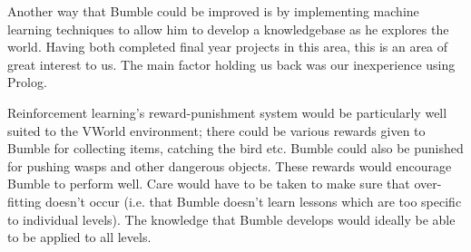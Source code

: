 \documentclass[a4paper,oneside]{report}
\begin{document}
Another way that Bumble could be improved is by implementing machine learning techniques to allow him to develop a knowledgebase as he explores the world. Having both completed final year projects in this area, this is an area of great interest to us. The main factor holding us back was our inexperience using Prolog. 

Reinforcement learning's reward-punishment system would be particularly well suited to the VWorld environment; there could be various rewards given to Bumble for collecting items, catching the bird etc. Bumble could also be punished for pushing wasps and other dangerous objects. These rewards would encourage Bumble to perform well. Care would have to be taken to make sure that over-fitting doesn't occur (i.e. that Bumble doesn't learn lessons which are too specific to individual levels). The knowledge that Bumble develops would ideally be able to be applied to all levels.
		
\end{document}
